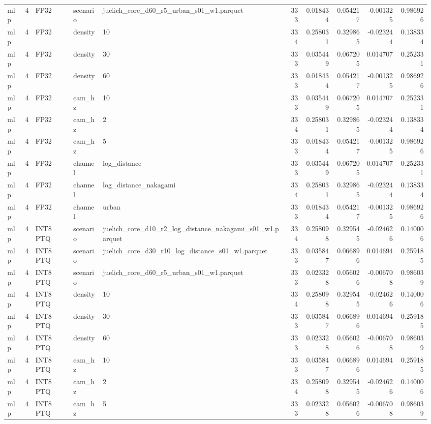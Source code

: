 \begin{tabular}{lrlllrrrrr}
mlp & 4 & FP32 & scenario & juelich\_core\_d60\_r5\_urban\_s01\_w1.parquet & 333 & 0.018434 & 0.054217 & -0.001325 & 0.986926 \\
mlp & 4 & FP32 & density & 10 & 334 & 0.258031 & 0.329865 & -0.023244 & 0.138334 \\
mlp & 4 & FP32 & density & 30 & 333 & 0.035449 & 0.067205 & 0.014707 & 0.252331 \\
mlp & 4 & FP32 & density & 60 & 333 & 0.018434 & 0.054217 & -0.001325 & 0.986926 \\
mlp & 4 & FP32 & cam\_hz & 10 & 333 & 0.035449 & 0.067205 & 0.014707 & 0.252331 \\
mlp & 4 & FP32 & cam\_hz & 2 & 334 & 0.258031 & 0.329865 & -0.023244 & 0.138334 \\
mlp & 4 & FP32 & cam\_hz & 5 & 333 & 0.018434 & 0.054217 & -0.001325 & 0.986926 \\
mlp & 4 & FP32 & channel & log\_distance & 333 & 0.035449 & 0.067205 & 0.014707 & 0.252331 \\
mlp & 4 & FP32 & channel & log\_distance\_nakagami & 334 & 0.258031 & 0.329865 & -0.023244 & 0.138334 \\
mlp & 4 & FP32 & channel & urban & 333 & 0.018434 & 0.054217 & -0.001325 & 0.986926 \\
mlp & 4 & INT8 PTQ & scenario & juelich\_core\_d10\_r2\_log\_distance\_nakagami\_s01\_w1.parquet & 334 & 0.258098 & 0.329545 & -0.024626 & 0.140006 \\
mlp & 4 & INT8 PTQ & scenario & juelich\_core\_d30\_r10\_log\_distance\_s01\_w1.parquet & 333 & 0.035847 & 0.066896 & 0.014694 & 0.259185 \\
mlp & 4 & INT8 PTQ & scenario & juelich\_core\_d60\_r5\_urban\_s01\_w1.parquet & 333 & 0.023328 & 0.056026 & -0.006708 & 0.986039 \\
mlp & 4 & INT8 PTQ & density & 10 & 334 & 0.258098 & 0.329545 & -0.024626 & 0.140006 \\
mlp & 4 & INT8 PTQ & density & 30 & 333 & 0.035847 & 0.066896 & 0.014694 & 0.259185 \\
mlp & 4 & INT8 PTQ & density & 60 & 333 & 0.023328 & 0.056026 & -0.006708 & 0.986039 \\
mlp & 4 & INT8 PTQ & cam\_hz & 10 & 333 & 0.035847 & 0.066896 & 0.014694 & 0.259185 \\
mlp & 4 & INT8 PTQ & cam\_hz & 2 & 334 & 0.258098 & 0.329545 & -0.024626 & 0.140006 \\
mlp & 4 & INT8 PTQ & cam\_hz & 5 & 333 & 0.023328 & 0.056026 & -0.006708 & 0.986039 \\

\end{tabular}
